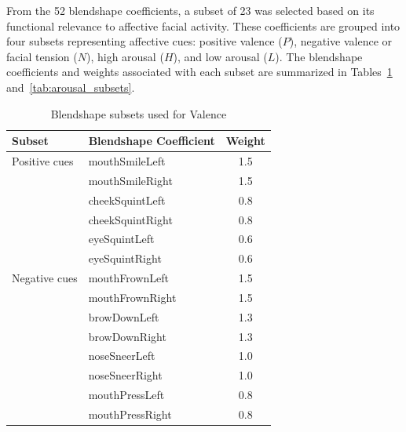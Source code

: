 \documentclass[letterpaper, 10 pt, conference]{ieeeconf}  %
\begin{document}
From the 52 blendshape coefficients, a subset of 23 was selected based on its functional relevance to affective facial activity. These coefficients are grouped into four subsets representing affective cues: positive valence ($P$), negative valence or facial tension ($N$), high arousal ($H$), and low arousal ($L$). The blendshape coefficients and weights associated with each subset are summarized in Tables~\ref{tab:valence_subsets} and~\ref{tab:arousal_subsets}.

\begin{table}[htbp]
\caption{Blendshape subsets used for Valence}
\label{tab:valence_subsets}
\centering
\setlength{\tabcolsep}{4pt}
\renewcommand{\arraystretch}{1.05}
\small
\begin{tabular}{l l c}
\hline
\textbf{Subset} & \textbf{Blendshape Coefficient} & \textbf{Weight} \\
\hline

Positive cues & mouthSmileLeft  & 1.5 \\
              & mouthSmileRight & 1.5 \\
              & cheekSquintLeft & 0.8 \\
              & cheekSquintRight& 0.8 \\
              & eyeSquintLeft   & 0.6 \\
              & eyeSquintRight  & 0.6 \\
\hline

Negative cues & mouthFrownLeft  & 1.5 \\
              & mouthFrownRight & 1.5 \\
              & browDownLeft    & 1.3 \\
              & browDownRight   & 1.3 \\
              & noseSneerLeft   & 1.0 \\
              & noseSneerRight  & 1.0 \\
              & mouthPressLeft  & 0.8 \\
              & mouthPressRight & 0.8 \\
\hline
\end{tabular}
\end{table}
\end{document}
